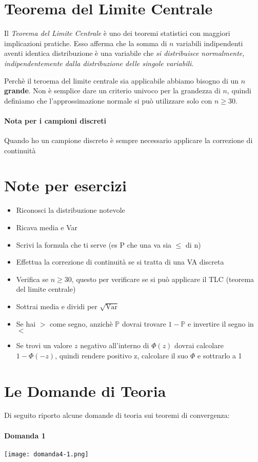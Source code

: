 \pagebreak

\section{Teorema del Limite Centrale}
Il \emph{Teorema del Limite Centrale} è uno dei teoremi statistici con maggiori implicazioni pratiche. 
Esso afferma che la somma di $n$ variabili indipendenti aventi identica distribuzione è una variabile che 
\emph{si distribuisce normalmente, indipendentemente dalla distribuzione delle singole variabili}.

Perchè il teroema del limite centrale sia applicabile abbiamo bisogno di un $n$ \textbf{grande}.
Non è semplice dare un criterio univoco per la grandezza di $n$, quindi definiamo che l'approssimazione normale si può utilizzare solo con $n\geq 30$.

\paragraph*{Nota per i campioni discreti} Quando ho un campione discreto è sempre necessario
applicare la correzione di continuità 

\section*{Note per esercizi}
\begin{itemize}
    \item Riconosci la distribuzione notevole
    \item Ricava media e Var
    \item Scrivi la formula che ti serve (es P che una va sia $\leq$ di n)
    \item Effettua la correzione di continuità se si tratta di una VA discreta
    \item Verifica se $n\geq 30$, questo per verificare se si può applicare il TLC (teorema del limite centrale)
    \item Sottrai media e dividi per $\sqrt{\text{Var}}$
    \item Se hai $>$ come segno, anzichè $\mathbb{P}$ dovrai trovare $1-\mathbb{P}$ e invertire il segno in $<$
    \item Se trovi un valore $z$ negativo all'interno di $\Phi(z)$ dovrai calcolare $1 - \Phi(-z)$, quindi rendere positivo
    z, calcolare il suo $\Phi$ e sottrarlo a 1
\end{itemize}

\pagebreak
\section{Le Domande di Teoria}
Di seguito riporto alcune domande di teoria sui teoremi di convergenza:
\paragraph{Domanda 1}
\begin{center}
    \texttt{[image: domanda4-1.png]}
\end{center}
